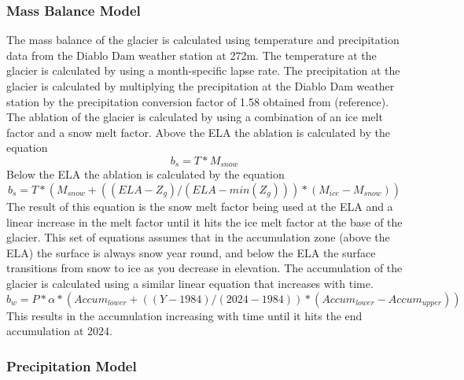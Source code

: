\documentclass{article}
\begin{document}
\subsubsection{Mass Balance Model}
The mass balance of the glacier is calculated using temperature and precipitation data from the Diablo Dam weather station at 272m. The 
temperature at the glacier is calculated by using a month-specific lapse rate. 
The precipitation at the glacier is calculated by multiplying the precipitation at the Diablo Dam weather station by the precipitation conversion factor of 1.58 
obtained from (reference). The ablation of the glacier is calculated by using a combination of an ice melt factor and a snow melt factor. Above the ELA the 
ablation is calculated by the equation
\begin{equation}b_s=T*M_{snow}\end{equation}
Below the ELA the ablation is calculated by the equation
\begin{equation}b_s=T*(M_{snow}+((ELA-Z_g)/(ELA-min(Z_g)))*(M_{ice}-M_{snow}))\end{equation}
The result of this equation is the snow melt factor being used at the ELA and a linear increase in the melt factor until it hits the ice melt 
factor at the base of the glacier. This set of equations assumes that in the accumulation zone (above the ELA) the surface is always snow year 
round, and below the ELA the surface transitions from snow to ice as you decrease in elevation.
The accumulation of the glacier is calculated using a similar linear equation that increases with time.
\begin{equation}b_w=P*\alpha*({Accum}_{lower}+((Y-1984)/(2024-1984))*({Accum}_{lower}-{Accum}_{upper}))\end{equation}
This results in the accumulation increasing with time until it hits the end accumulation at 2024. 

\subsubsection{Precipitation Model}
\end{document}
